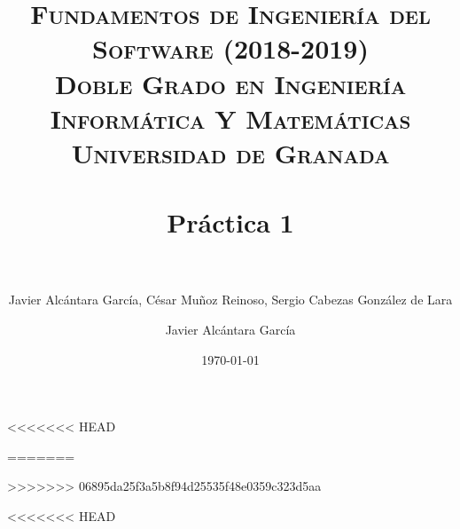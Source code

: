 



\title{	
\normalfont \normalsize 
\textsc{\textbf{Fundamentos de Ingeniería del Software (2018-2019)} \\ Doble Grado en Ingeniería Informática Y Matemáticas \\ Universidad de Granada} \\ [25pt] %
\horrule{0.5pt} \\[0.4cm] %
\huge Práctica 1 \\ %
\horrule{2pt} \\[0.5cm] %
}

<<<<<<< HEAD
\author{Javier Alcántara García, César Muñoz Reinoso, Sergio Cabezas González de Lara} %
=======
\author{Javier Alcántara García}%
>>>>>>> 06895da25f3a5b8f94d25535f48e0359c323d5aa

\date{\normalsize\today} %





\maketitle %

\newpage %

\tableofcontents %

\listoffigures

\listoftables

\newpage


<<<<<<< HEAD
